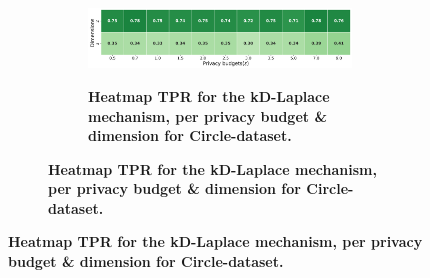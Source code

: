 \newpage
\begin{figure}[H]
    \centering
    \begin{subfigure}[b]{0.9\textwidth}
        \begin{subfigure}[c]{1\textwidth}
            \caption{\textbf{Heatmap TPR for the kD-Laplace mechanism, per privacy budget \& dimension for Circle-dataset.}}
            \includegraphics[width=1\textwidth]{Results/kd-laplace/kd-Laplace/circle-dataset/tpr.png}
            \label{fig:privacy_tpr_circle-dataset_adversial_advantage_kd-laplace}
        \end{subfigure}
        \vfill %


\end{subfigure}
\end{figure}
